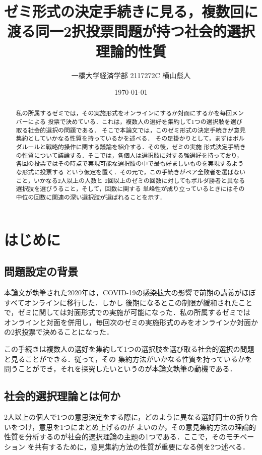 \documentclass[dvipdfmx]{jsarticle}
\begin{document}
\title{ゼミ形式の決定手続きに見る，複数回に渡る同一2択投票問題が持つ社会的選択理論的性質}
\author{一橋大学経済学部 2117272C 横山彪人}
\date{\today}
\maketitle

\begin{abstract}
  私の所属するゼミでは，その実施形式をオンラインにするか対面にするかを毎回メンバーによる
  投票で決めている．これは，複数人の選好を集約して1つの選択肢を選び取る社会的選択の問題である．
  そこで本論文では，このゼミ形式の決定手続きが意見集約としていかなる性質を持っているかを述べる．
  その足掛かりとして，まずはボルダルールと戦略的操作に関する議論を紹介する．その後，ゼミの実施
  形式決定手続きの性質について議論する．そこでは，各個人は選択肢に対する強選好を持っており，
  各回の投票ではその時点で実現可能な選択肢の中で最も好ましいものを実現するような形式に投票する
  という仮定を置く．その元で，この手続きがペア全敗者を選ばないこと，いかなる2人以上の人数と
  2回以上のゼミの回数に対してもボルダ勝者と異なる選択肢を選びうること，そして，回数に関する
  単峰性が成り立っているときにはその中位の回数に関連の深い選択肢が選ばれることを示す．
\end{abstract}

\tableofcontents
\clearpage

\section{はじめに}
\subsection{問題設定の背景}
本論文が執筆された2020年は，COVID-19の感染拡大の影響で前期の講義がほぼすべてオンラインに移行した．しかし
後期になるとこの制限が緩和されたことで，ゼミに関しては対面形式での実施が可能になった．私の所属するゼミでは
オンラインと対面を併用し，毎回次のゼミの実施形式のみをオンラインか対面かの2択投票で決めることになった．

この手続きは複数人の選好を集約して1つの選択肢を選び取る社会的選択の問題と見ることができる．従って，その
集約方法がいかなる性質を持っているかを問うことができ，それを探究したいというのが本論文執筆の動機である．

\subsection{社会的選択理論とは何か}\label{社会的選択とは何か}
2人以上の個人で1つの意思決定をする際に，どのように異なる選好同士の折り合いをつけ，意思を1つにまとめ上げるのが
よいのか，その意見集約方法の理論的性質を分析するのが社会的選択理論の主題の1つである．ここで，そのモチベーション
を共有するために，意見集約方法の性質が重要になる例を2つ述べる．
\end{document}
